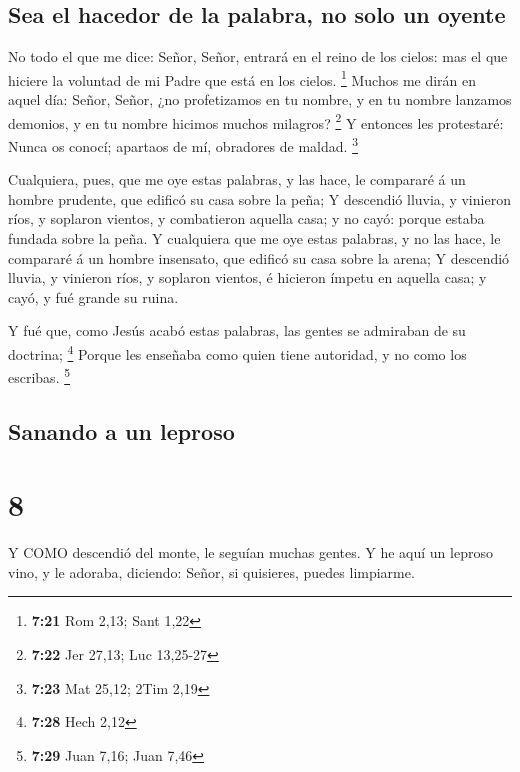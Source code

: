 \hypertarget{sea-el-hacedor-de-la-palabra-no-solo-un-oyente}{%
\subsection{Sea el hacedor de la palabra, no solo un
oyente}\label{sea-el-hacedor-de-la-palabra-no-solo-un-oyente}}

 No todo el que me dice: Señor, Señor, entrará en el reino
de los cielos: mas el que hiciere la voluntad de mi Padre que está en
los cielos. \footnote{\textbf{7:21} Rom 2,13; Sant 1,22} 
Muchos me dirán en aquel día: Señor, Señor, ¿no profetizamos en tu
nombre, y en tu nombre lanzamos demonios, y en tu nombre hicimos muchos
milagros? \footnote{\textbf{7:22} Jer 27,13; Luc 13,25-27} 
Y entonces les protestaré: Nunca os conocí; apartaos de mí, obradores de
maldad. \footnote{\textbf{7:23} Mat 25,12; 2Tim 2,19}

 Cualquiera, pues, que me oye estas palabras, y las hace,
le compararé á un hombre prudente, que edificó su casa sobre la peña;
 Y descendió lluvia, y vinieron ríos, y soplaron vientos, y
combatieron aquella casa; y no cayó: porque estaba fundada sobre la
peña.  Y cualquiera que me oye estas palabras, y no las
hace, le compararé á un hombre insensato, que edificó su casa sobre la
arena;  Y descendió lluvia, y vinieron ríos, y soplaron
vientos, é hicieron ímpetu en aquella casa; y cayó, y fué grande su
ruina.

 Y fué que, como Jesús acabó estas palabras, las gentes se
admiraban de su doctrina; \footnote{\textbf{7:28} Hech 2,12}
 Porque les enseñaba como quien tiene autoridad, y no como
los escribas. \footnote{\textbf{7:29} Juan 7,16; Juan 7,46}

\hypertarget{sanando-a-un-leproso}{%
\subsection{Sanando a un leproso}\label{sanando-a-un-leproso}}

\hypertarget{section-7}{%
\section{8}\label{section-7}}

 Y COMO descendió del monte, le seguían muchas gentes.
 Y he aquí un leproso vino, y le adoraba, diciendo: Señor,
si quisieres, puedes limpiarme.

